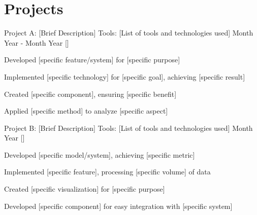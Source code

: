 \section{\textbf{Projects}}
\vspace{-0.4mm}
\resumeSubHeadingListStart

\resumeProject
  {Project A: [Brief Description]}
  {Tools: [List of tools and technologies used]}
  {Month Year - Month Year}
  {{}[\href{https://github.com/your-username/project-a}{\textcolor{darkblue}{\faGithub}}]}
\resumeItemListStart
  \item Developed [specific feature/system] for [specific purpose]
  \item Implemented [specific technology] for [specific goal], achieving [specific result]
  \item Created [specific component], ensuring [specific benefit]
  \item Applied [specific method] to analyze [specific aspect]
\resumeItemListEnd

\resumeProject
  {Project B: [Brief Description]}
  {Tools: [List of tools and technologies used]}
  {Month Year}
  {{}[\href{https://github.com/your-username/project-b}{\textcolor{darkblue}{\faGithub}}]}
\resumeItemListStart
  \item Developed [specific model/system], achieving [specific metric]
  \item Implemented [specific feature], processing [specific volume] of data
  \item Created [specific visualization] for [specific purpose]
  \item Developed [specific component] for easy integration with [specific system]
\resumeItemListEnd

\resumeSubHeadingListEnd
